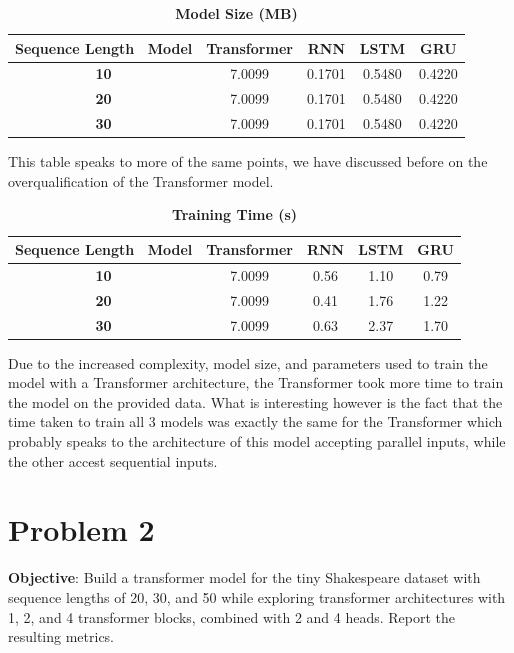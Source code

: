 \documentclass[a4paper]{article}
\begin{document}
\begin{table}[H]
    \centering
    \caption{\textbf{Model Size (MB)}}
    \label{tab:MBp1}
    \begin{tabular}{| c || c | c | c | c |}
        \hline
        Sequence Length \ Model & \textbf{Transformer} & \textbf{RNN} & \textbf{LSTM} & \textbf{GRU} \\
        \hline
        \textbf{10} & 7.0099 & 0.1701 & 0.5480 & 0.4220 \\
        \hline
        \textbf{20} & 7.0099 & 0.1701 & 0.5480 & 0.4220 \\
        \hline
        \textbf{30} & 7.0099 & 0.1701 & 0.5480 & 0.4220 \\
        \hline
    \end{tabular}
\end{table}

This table speaks to more of the same points, we have discussed before on the overqualification of the Transformer model.

\begin{table}[H]
    \centering
    \caption{\textbf{Training Time (s)}}
    \label{tab:trainTp1}
    \begin{tabular}{| c || c | c | c | c |}
        \hline
        Sequence Length \ Model & \textbf{Transformer} & \textbf{RNN} & \textbf{LSTM} & \textbf{GRU} \\
        \hline
        \textbf{10} & 7.0099 & 0.56 & 1.10 & 0.79 \\
        \hline
        \textbf{20} & 7.0099 & 0.41 & 1.76 & 1.22 \\
        \hline
        \textbf{30} & 7.0099 & 0.63 & 2.37 & 1.70 \\
        \hline
    \end{tabular}
\end{table}

Due to the increased complexity, model size, and parameters used to train the model with a Transformer architecture, the Transformer took more time to train the model on the provided data. What is interesting however is the fact that the time taken to train all 3 models was exactly the same for the Transformer which probably speaks to the architecture of this model accepting parallel inputs, while the other accest sequential inputs.

\section*{\textbf{Problem 2}}
\textbf{Objective}: Build a transformer model for the tiny Shakespeare dataset with sequence lengths of 20, 30, and 50 while exploring transformer architectures with 1, 2, and 4 transformer blocks, combined with 2 and 4 heads. Report the resulting metrics.
\end{document}
